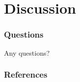 \documentclass[aspectratio=169]{beamer}
\begin{document}
\section{Discussion}
\begin{frame}[t]
    \frametitle{Questions}
    \vspace{2.0cm}
    \begin{center}
        Any questions?
    \end{center}
\end{frame}
\begin{frame}[t]
    \frametitle{References}
    \printbibliography

\end{frame}
\end{document}
